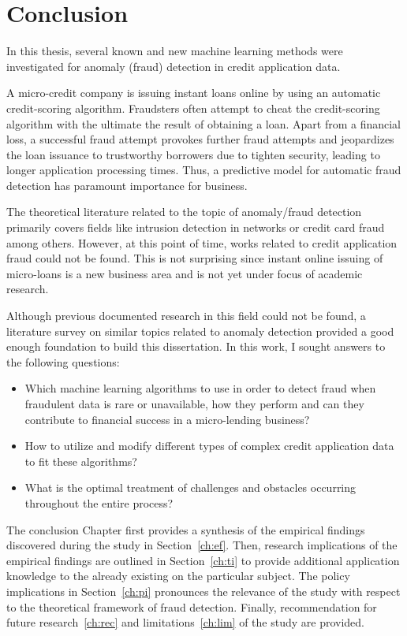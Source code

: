 \chapter{Conclusion}\label{Chapter:7}

In this thesis, several known and new machine learning methods were investigated for anomaly (fraud) detection in credit application data.

A micro-credit company is issuing instant loans online by using an automatic credit-scoring algorithm. Fraudsters often attempt to cheat the credit-scoring algorithm with the ultimate
the result of obtaining a loan. Apart from a financial loss, a successful fraud attempt provokes further fraud attempts and jeopardizes the loan issuance to trustworthy borrowers due to tighten security, leading to longer application processing times. Thus, a predictive model for automatic fraud detection has paramount importance for business.

The theoretical literature related to the topic of anomaly/fraud detection primarily covers fields like intrusion detection in networks or credit card fraud among others. However, at this point of time, works related to credit application fraud could not be found. This is not surprising since instant online issuing of micro-loans is a new business area and is not yet under focus of academic research. 

Although previous documented research in this field could not be found, a literature survey on similar topics related to anomaly detection provided a good enough foundation to build this dissertation. In this work, I sought answers to the following questions: 

\begin{itemize}
        \item Which machine learning algorithms to use in order to detect fraud when fraudulent data is rare or unavailable, how they perform and can they contribute to financial success in a micro-lending business?
    
        \item How to utilize and modify different types of complex credit application data to fit these algorithms?
        
        \item What is the optimal treatment of challenges and obstacles occurring throughout the entire process?
        
\end{itemize}

The conclusion Chapter first provides a synthesis of the empirical findings discovered during the study in Section~\ref{ch:ef}. Then, research implications of the empirical findings are outlined in Section~\ref{ch:ti} to provide additional application knowledge to the already existing on the particular subject. The policy implications in Section~\ref{ch:pi} pronounces the relevance of the study with respect to the theoretical framework of fraud detection. Finally, recommendation for future research~\ref{ch:rec} and limitations~\ref{ch:lim} of the study are provided.


